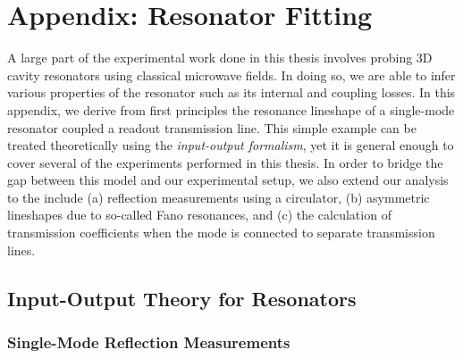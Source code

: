 \chapter{Appendix: Resonator Fitting\label{ch:AppA}}

A large part of the experimental work done in this thesis involves probing 3D cavity resonators using classical microwave fields. In doing so, we are able to infer various properties of the resonator such as its internal and coupling losses. In this appendix, we derive from first principles the resonance lineshape of a single-mode resonator coupled a readout transmission line. This simple example can be treated theoretically using the \textit{input-output formalism}, yet it is general enough to cover several of the experiments performed in this thesis. In order to bridge the gap between this model and our experimental setup, we also extend our analysis to the include (a) reflection measurements using a circulator, (b) asymmetric lineshapes due to so-called Fano resonances, and (c) the calculation of transmission coefficients when the mode is connected to separate transmission lines. 

\section{Input-Output Theory for Resonators}
\subsection{Single-Mode Reflection Measurements}

